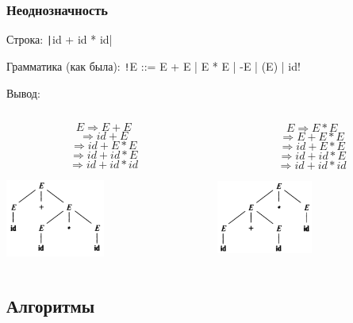 \documentclass[xetex,mathserif,serif]{beamer}
\begin{document}
	\begin{frame}
		\frametitle{Неоднозначность}
		Строка: \texttt|id + id * id|

		Грамматика (как была): \texttt!E ::= E + E | E * E | -E | (E) | id!

		Вывод:
		\begin{columns}
			\begin{column}{0.5\textwidth}
				$$E \Rightarrow E + E$$
				$$\Rightarrow id + E$$
				$$\Rightarrow id + E * E$$
				$$\Rightarrow id + id * E$$
				$$\Rightarrow id + id * id$$
				\begin{center}
					\includegraphics[width=0.5\textwidth]{ambiguousGrammarA.png}
				\end{center}
			\end{column}
			\begin{column}{0.5\textwidth}
				$$E \Rightarrow E * E$$
				$$\Rightarrow E + E * E$$
				$$\Rightarrow id + E * E$$
				$$\Rightarrow id + id * E$$
				$$\Rightarrow id + id * id$$
				\begin{center}
					\includegraphics[width=0.5\textwidth]{ambiguousGrammarB.png}
				\end{center}
			\end{column}
		\end{columns}
	\end{frame}

	\subsection{Алгоритмы}
\end{document}
